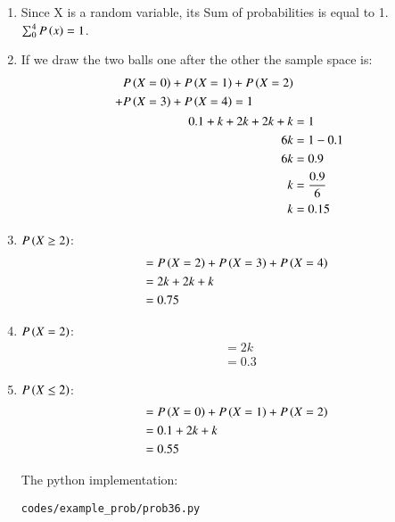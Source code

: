 \renewcommand{\theequation}{\theenumi}
\begin{enumerate}

\item Since X is a random variable, its Sum of probabilities is equal to 1. $\sum^4_0 P\left(x\right) = 1$.

\item If we draw the two balls one after the other the sample space is:
\begin{align}
\begin{split}
P\left(X=0\right) &+ P\left(X=1\right) + P\left(X=2\right) \\
+ P\left(X=3\right) &+ P\left(X=4\right) = 1
\end{split}\\
0.1 + k + 2k + 2k + k &= 1 \\
6k &= 1 - 0.1\\
6k &= 0.9 \\
k &= \frac{0.9}{6}\\
k &= 0.15
\end{align}

\item $P\left(X \geq 2\right)$:
\begin{align}
&= P\left(X=2\right) + P\left(X=3\right) + P\left(X=4\right)\\
&= 2k + 2k + k \\
&= 0.75
\end{align}

\item $P\left(X=2\right)$:
\begin{align}
&= 2k \\
&= 0.3
\end{align}

\item $P\left(X \leq 2\right)$:
\begin{align}
&= P\left(X=0\right) + P\left(X=1\right) + P\left(X=2\right)\\
&= 0.1 + 2k + k \\
&= 0.55
\end{align}

The python implementation:
\begin{lstlisting}
codes/example_prob/prob36.py
\end{lstlisting}

\end{enumerate}